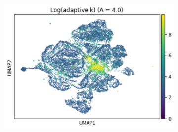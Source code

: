 \documentclass{article}
\begin{document}
\begin{figure}
\begin{subfigure}[t]{0.32\textwidth}
        \includegraphics[width=\linewidth]{figs/notMNIST_logadaK_Aeq4.png} %
    \end{subfigure}
    \hfill
    

\end{figure}
\end{document}
